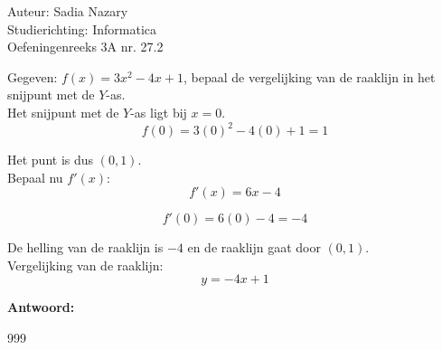 \documentclass[a4paper]{article}
\begin{document}
\noindent \large Auteur: Sadia Nazary \\
\noindent \large Studierichting: Informatica \\
\noindent \large Oefeningenreeks 3A nr. 27.2 \\

\medskip

\normalsize

 Gegeven: $f(x) = 3x^2 - 4x + 1$, bepaal de vergelijking van de raaklijn in het snijpunt met de $Y$-as. \\

 Het snijpunt met de $Y$-as ligt bij $x = 0$. \\

$$f(0) = 3(0)^2 - 4(0) + 1 = 1$$

 Het punt is dus $(0, 1)$. \\

 Bepaal nu $f'(x)$: \\

$$f'(x) = 6x - 4$$

$$f'(0) = 6(0) - 4 = -4$$

 De helling van de raaklijn is $-4$ en de raaklijn gaat door $(0, 1)$. \\

 Vergelijking van de raaklijn: \\

$$y = -4x + 1$$

 \textbf{Antwoord:}  \\

\begin{thebibliography}{999}
\end{thebibliography}
\end{document}
